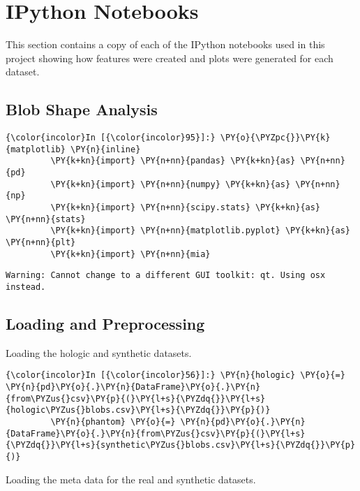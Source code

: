 \chapter{IPython Notebooks}
This section contains a copy of each of the IPython notebooks used in this project showing how features were created and plots were generated for each dataset.


\section*{Blob Shape Analysis}

    \begin{Verbatim}[commandchars=\\\{\}]
{\color{incolor}In [{\color{incolor}95}]:} \PY{o}{\PYZpc{}}\PY{k}{matplotlib} \PY{n}{inline}
         \PY{k+kn}{import} \PY{n+nn}{pandas} \PY{k+kn}{as} \PY{n+nn}{pd}
         \PY{k+kn}{import} \PY{n+nn}{numpy} \PY{k+kn}{as} \PY{n+nn}{np}
         \PY{k+kn}{import} \PY{n+nn}{scipy.stats} \PY{k+kn}{as} \PY{n+nn}{stats}
         \PY{k+kn}{import} \PY{n+nn}{matplotlib.pyplot} \PY{k+kn}{as} \PY{n+nn}{plt}
         \PY{k+kn}{import} \PY{n+nn}{mia}
\end{Verbatim}

    \begin{Verbatim}[commandchars=\\\{\}]
Warning: Cannot change to a different GUI toolkit: qt. Using osx instead.
    \end{Verbatim}

    \section{Loading and Preprocessing}\label{loading-and-preprocessing}

    Loading the hologic and synthetic datasets.

    \begin{Verbatim}[commandchars=\\\{\}]
{\color{incolor}In [{\color{incolor}56}]:} \PY{n}{hologic} \PY{o}{=} \PY{n}{pd}\PY{o}{.}\PY{n}{DataFrame}\PY{o}{.}\PY{n}{from\PYZus{}csv}\PY{p}{(}\PY{l+s}{\PYZdq{}}\PY{l+s}{hologic\PYZus{}blobs.csv}\PY{l+s}{\PYZdq{}}\PY{p}{)}
         \PY{n}{phantom} \PY{o}{=} \PY{n}{pd}\PY{o}{.}\PY{n}{DataFrame}\PY{o}{.}\PY{n}{from\PYZus{}csv}\PY{p}{(}\PY{l+s}{\PYZdq{}}\PY{l+s}{synthetic\PYZus{}blobs.csv}\PY{l+s}{\PYZdq{}}\PY{p}{)}
\end{Verbatim}

    Loading the meta data for the real and synthetic datasets.

